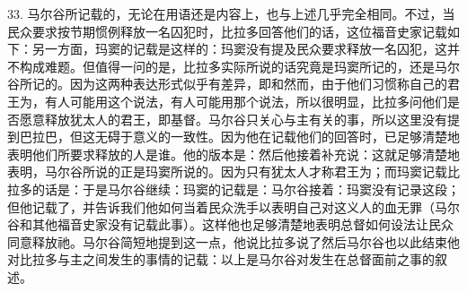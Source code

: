 33. 马尔谷所记载的，无论在用语还是内容上，也与上述几乎完全相同。不过，当民众要求按节期惯例释放一名囚犯时，比拉多回答他们的话，这位福音史家记载如下：另一方面，玛窦的记载是这样的：玛窦没有提及民众要求释放一名囚犯，这并不构成难题。但值得一问的是，比拉多实际所说的话究竟是玛窦所记的，还是马尔谷所记的。因为这两种表达形式似乎有差异，即和然而，由于他们习惯称自己的君王为，有人可能用这个说法，有人可能用那个说法，所以很明显，比拉多问他们是否愿意释放犹太人的君王，即基督。马尔谷只关心与主有关的事，所以这里没有提到巴拉巴，但这无碍于意义的一致性。因为他在记载他们的回答时，已足够清楚地表明他们所要求释放的人是谁。他的版本是：然后他接着补充说：这就足够清楚地表明，马尔谷所说的正是玛窦所说的。因为只有犹太人才称君王为；而玛窦记载比拉多的话是：于是马尔谷继续：玛窦的记载是：马尔谷接着：玛窦没有记录这段；但他记载了，并告诉我们他如何当着民众洗手以表明自己对这义人的血无罪（马尔谷和其他福音史家没有记载此事）。这样他也足够清楚地表明总督如何设法让民众同意释放祂。马尔谷简短地提到这一点，他说比拉多说了然后马尔谷也以此结束他对比拉多与主之间发生的事情的记载：以上是马尔谷对发生在总督面前之事的叙述。\par

